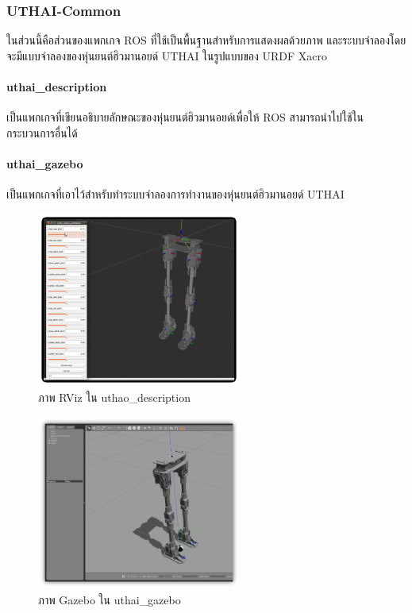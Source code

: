 \clearpage
\subsubsection*{UTHAI-Common}
ในส่วนนี้คือส่วนของแพกเกจ ROS ที่ใช้เป็นพื้นฐานสำหรับการแสดงผลด้วยภาพ และระบบจำลองโดยจะมีแบบจำลองของหุ่นยนต์ฮิวมานอยด์ UTHAI ในรูปแบบของ URDF Xacro
\paragraph*{uthai\_description}
เป็นแพกเกจที่เขียนอธิบายลักษณะของหุ่นยนต์ฮิวมานอยด์เพื่อให้ ROS สามารถนำไปใช้ในกระบวนการอื่นได้
\paragraph*{uthai\_gazebo}
เป็นแพกเกจที่เอาไว้สำหรับทำระบบจำลองการทำงานของหุ่นยนต์ฮิวมานอยด์ UTHAI

\begin{figure}[!ht]
	\centering
	\includegraphics[width=0.6\textwidth]{chapter4/images/uthai_platform/uthai_rviz.png}
	\caption{ภาพ RViz ใน uthao\_description}
\end{figure}
\begin{figure}[!ht]
	\centering
	\includegraphics[width=0.6\textwidth]{chapter4/images/uthai_platform/uthai_gazebo.png}
	\caption{ภาพ Gazebo ใน uthai\_gazebo}
\end{figure}


